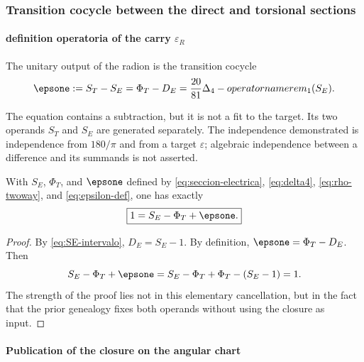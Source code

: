 \subsubsection{Transition cocycle between the direct and torsional sections}

\paragraph{definition operatoria of the carry \(\varepsilon_R\)}

\begin{definition}
The unitary output of the radion is the transition cocycle
\begin{equation}
\epsone:=S_T-S_E
=\Phi_T-D_E
=\frac{20}{81}\Delta_4-operatorname{rem}_1(S_E).
\label{eq:epsilon-def}
\end{equation}
\end{definition}

The equation contains a subtraction, but it is not a fit to the target. Its two operands \(S_T\) and \(S_E\) are generated separately. The independence demonstrated is independence from \(180/\pi\) and from a target \(\varepsilon\); algebraic independence between a difference and its summands is not asserted.

\begin{theorem}
With \(S_E\), \(\Phi_T\), and \(\epsone\) defined by
\eqref{eq:seccion-electrica}, \eqref{eq:delta4}, \eqref{eq:rho-twoway}, and
\eqref{eq:epsilon-def}, one has exactly
\begin{equation}
\boxed{1=S_E-\Phi_T+\epsone.}
\label{eq:cierre-unitario}
\end{equation}
\end{theorem}
\begin{proof}
By \eqref{eq:SE-intervalo}, \(D_E=S_E-1\). By definition,
\(\epsone=\Phi_T-D_E\). Then
\[
S_E-\Phi_T+\epsone
=S_E-\Phi_T+\Phi_T-(S_E-1)=1.
\]
The strength of the proof lies not in this elementary cancellation, but in the fact that the
prior genealogy fixes both operands without using the closure as input.
\end{proof}

\paragraph{Publication of the closure on the angular chart}

